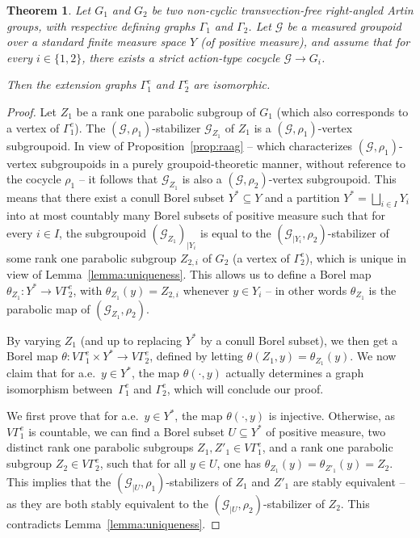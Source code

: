 \documentclass[JEP,XML,SOM,Unicode,NoFloatCountersInSection,published]{cedram}
\let\mathcal\mathscr
\theoremstyle{plain}
\newtheorem{theo}{Theorem}[section]
\theoremstyle{definition}
\let\Dunion\bigsqcup
\newcommand{\calg}{\mathcal{G}}
\begin{document}
\begin{theo}\label{theo:main-2}
Let $G_1$ and $G_2$ be two non-cyclic transvection-free right-angled Artin groups, with respective defining graphs $\Gamma_1$ and $\Gamma_2$. Let $\calg$ be a measured groupoid over a standard finite measure space $Y$ (of positive measure), and assume that for every $i\in\{1,2\}$, there exists a strict action-type cocycle $\calg\to G_i$.

Then the extension graphs $\Gamma_1^e$ and $\Gamma_2^e$ are isomorphic.
\end{theo}

\begin{proof}
Let $Z_1$ be a rank one parabolic subgroup of $G_1$ (which also corresponds to a vertex of $\Gamma_1^e$). The $(\calg,\rho_1)$-stabilizer $\calg_{Z_1}$ of $Z_1$ is a $(\calg,\rho_1)$-vertex subgroupoid. In view of Proposition~\ref{prop:raag} -- which characterizes $(\calg,\rho_1)$-vertex subgroupoids in a purely groupoid-theoretic manner, \ie without reference to the cocycle $\rho_1$ -- it follows that $\calg_{Z_1}$ is also a $(\calg,\rho_2)$-vertex subgroupoid. This means that there exist a conull Borel subset $Y^*\subseteq Y$ and a partition $Y^*=\Dunion_{i\in I} Y_i$ into at most countably many Borel subsets of positive measure such that for every $i\in I$, the subgroupoid $(\calg_{Z_1})_{|Y_i}$ is equal to the $(\calg_{|Y_i},\rho_2)$-stabilizer of some rank one parabolic subgroup $Z_{2,i}$ of $G_2$ (\ie a vertex of $\Gamma_2^e$), which is unique in view of Lemma~\ref{lemma:uniqueness}. This allows us to define a Borel map $\theta_{Z_1}:Y^*\to V\Gamma_2^e$, with $\theta_{Z_1}(y)=Z_{2,i}$ whenever $y\in Y_i$ -- in other words $\theta_{Z_1}$ is the parabolic map of $(\calg_{Z_1},\rho_2)$.

By varying $Z_1$ (and up to replacing $Y^*$ by a conull Borel subset), we then get a Borel map $\theta:V\Gamma_1^e\times Y^*\to V\Gamma_2^e$, defined by letting $\theta(Z_1,y)=\theta_{Z_1}(y)$. We now claim that for a.e.\ $y\in Y^*$, the map $\theta(\cdot,y)$ actually determines a graph isomorphism between~$\Gamma_1^e$ and $\Gamma_2^e$, which will conclude our proof.

We first prove that for a.e.\ $y\in Y^*$, the map $\theta(\cdot,y)$ is injective. Otherwise, as $V\Gamma_1^e$ is countable, we can find a Borel subset $U\subseteq Y^*$ of positive measure, two distinct rank one parabolic subgroups $Z_1,Z'_1\in V\Gamma^e_1$, and a rank one parabolic subgroup $Z_2\in V\Gamma_2^e$, such that for all $y\in U$, one has $\theta_{Z_1}(y)=\theta_{Z'_1}(y)=Z_2$. This implies that the $(\calg_{|U},\rho_1)$-stabilizers of $Z_1$ and $Z'_1$ are stably equivalent -- as they are both stably equivalent to the $(\calg_{|U},\rho_2)$-stabilizer of $Z_2$. This contradicts Lemma~\ref{lemma:uniqueness}.


\end{proof}
\end{document}
